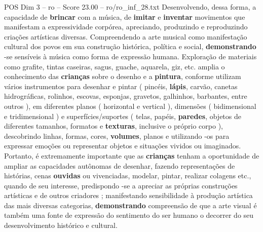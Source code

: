 \begin{textsample}{POS Dim 3 – ro – Score 23.00 – ro/ro\_inf\_28.txt}
Desenvolvendo, dessa forma, a capacidade de \textbf{brincar} com a música, de \textbf{imitar} e \textbf{inventar} movimentos que manifestam a expressividade corpórea, apreciando, produzindo e reproduzindo criações artísticas diversas.
Compreendendo a arte musical como manifestação cultural dos povos em sua construção histórica, política e social, \textbf{demonstrando} -se sensíveis à música como forma de expressão humana.
Exploração de materiais como grafite, tintas caseiras, sagus, guache, aquarela, giz, etc. amplia o conhecimento das \textbf{crianças} sobre o desenho e a \textbf{pintura}, conforme utilizam vários instrumentos para desenhar e pintar ( pincéis, \textbf{lápis}, carvão, canetas hidrográficas, rolinhos, escovas, esponjas, gravetos, galhinhos, barbantes, entre outros ), em diferentes planos ( horizontal e vertical ), dimensões ( bidimensional e tridimensional ) e superfícies/suportes ( telas, papéis, \textbf{paredes}, objetos de diferentes tamanhos, formatos e \textbf{texturas}, inclusive o próprio corpo ), descobrindo linhas, formas, cores, \textbf{volumes}, planos e utilizando -os para expressar emoções ou representar objetos e situações vividos ou imaginados.
Portanto, é extremamente importante que as \textbf{crianças} tenham a oportunidade de ampliar as capacidades autônomas de desenhar, fazendo representações de histórias, cenas \textbf{ouvidas} ou vivenciadas, modelar, pintar, realizar colagens etc., quando de seu interesse, predispondo -se a apreciar as próprias construções artísticas e de outros criadores ; manifestando sensibilidade à produção artística das mais diversas categorias, \textbf{demonstrando} compreensão de que a arte visual é também uma fonte de expressão do sentimento do ser humano o decorrer do seu desenvolvimento histórico e cultural.

\end{textsample}
